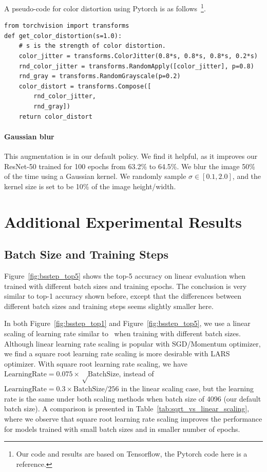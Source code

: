 \documentclass{article}
\begin{document}
A pseudo-code for color distortion using Pytorch is as follows~\footnote{Our code and results are based on Tensorflow, the Pytorch code here is a reference.}.
\begin{verbatim}
from torchvision import transforms
def get_color_distortion(s=1.0):
    # s is the strength of color distortion.
    color_jitter = transforms.ColorJitter(0.8*s, 0.8*s, 0.8*s, 0.2*s)
    rnd_color_jitter = transforms.RandomApply([color_jitter], p=0.8)
    rnd_gray = transforms.RandomGrayscale(p=0.2)
    color_distort = transforms.Compose([
        rnd_color_jitter,
        rnd_gray])
    return color_distort
\end{verbatim}

\paragraph{Gaussian blur}

This augmentation is in our default policy. We find it helpful, as it improves our ResNet-50 trained for 100 epochs from 63.2\% to 64.5\%. We blur the image 50\% of the time using a Gaussian kernel. We randomly sample $\sigma\in[0.1, 2.0]$, and the kernel size is set to be 10\% of the image height/width.

\section{Additional Experimental Results}
\label{app:result}

\subsection{Batch Size and Training Steps}
\label{app:bsz_step}

Figure~\ref{fig:bsstep_top5} shows the top-5 accuracy on linear evaluation when trained with different batch sizes and training epochs. The conclusion is very similar to top-1 accuracy shown before, except that the differences between different batch sizes and training steps seems slightly smaller here.

In both Figure~\ref{fig:bsstep_top1} and Figure~\ref{fig:bsstep_top5}, we use a linear scaling of learning rate similar to~\cite{goyal2017accurate} when training with different batch sizes. Although linear learning rate scaling is popular with SGD/Momentum optimizer, we find a square root learning rate scaling is more desirable with LARS optimizer. With square root learning rate scaling, we have $\mathrm{LearningRate}=0.075\times\sqrt\mathrm{BatchSize}$, instead of $\mathrm{LearningRate}=0.3\times\mathrm{BatchSize}/256$ in the linear scaling case, but the learning rate is the same under both scaling methods when batch size of 4096 (our default batch size). A comparison is presented in Table~\ref{tab:sqrt_vs_linear_scaling}, where we observe that square root learning rate scaling improves the performance for models trained with small batch sizes and in smaller number of epochs.
\end{document}
